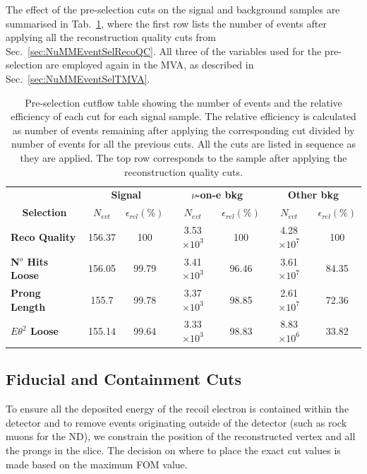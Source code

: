 The effect of the pre-selection cuts on the signal and background samples are summarised in Tab.~\ref{tab:CutflowTableBasicSelection}, where the first row lists the number of events after applying all the reconstruction quality cuts from Sec.~\ref{sec:NuMMEventSelRecoQC}. All three of the variables used for the pre-selection are employed again in the \gls{MVA}, as described in Sec.~\ref{sec:NuMMEventSelTMVA}.


\begin{table}[!hb]
\centering
\caption[Event selection cutflow table for the pre-selection]{Pre-selection cutflow table showing the number of events and the relative efficiency of each cut for each signal sample. The relative efficiency is calculated as number of events remaining after applying the corresponding cut divided by number of events for all the previous cuts. All the cuts are listed in sequence as they are applied. The top row corresponds to the sample after applying the reconstruction quality cuts.}
\begin{tabular}{|l|cc|cc|cc|}\hline
\multicolumn{1}{|c|}{} & \multicolumn{2}{c|}{\textbf{Signal}} & \multicolumn{2}{c|}{\textbf{$\nu$-on-e bkg}} & \multicolumn{2}{c|}{\textbf{Other bkg}} \\
\multicolumn{1}{|c|}{\multirow{-2}{*}{\textbf{Selection}}} & \textbf{$N_{evt}$} & \textbf{$\epsilon_{rel}\left(\%\right)$} & \textbf{$N_{evt}$} & \textbf{$\epsilon_{rel}\left(\%\right)$}  & \textbf{$N_{evt}$} & \textbf{$\epsilon_{rel}\left(\%\right)$}\\\hline
\textbf{Reco Quality} & 156.37 & 100 & 3.53$\times 10^3$ & 100 & 4.28$\times 10^7$ & 100\\
\textbf{N$^o$ Hits Loose} & 156.05 & 99.79 & 3.41$\times 10^3$ & 96.46 & 3.61$\times 10^7$ & 84.35\\
\textbf{Prong Length} & 155.7 & 99.78 & 3.37$\times 10^3$ & 98.85 & 2.61$\times 10^7$ & 72.36\\
\textbf{$E\theta^2$ Loose} & 155.14 & 99.64 & 3.33$\times 10^3$ & 98.83 & 8.83$\times 10^6$ & 33.82\\\hline
\end{tabular}
\label{tab:CutflowTableBasicSelection}
\end{table}

\subsection{Fiducial and Containment Cuts}\label{sec:NuMMEventSelFidCont}
To ensure all the deposited energy of the recoil electron is contained within the detector and to remove events originating outside of the detector (such as rock muons for the \gls{ND}), we constrain the position of the reconstructed vertex and all the prongs in the slice. The decision on where to place the exact cut values is made based on the maximum \gls{FOM} value.

